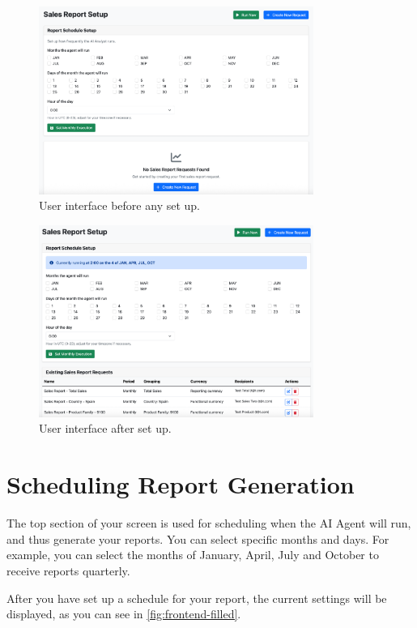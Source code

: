 \documentclass[a4paper]{report}
\begin{document}
\begin{figure}[H]
\centering
\includegraphics[width=0.8\textwidth]{images/frontend-empty.png}
\caption{User interface before any set up.}
\label{fig:frontend-empty}
\end{figure}

\begin{figure}[h]
\centering
\includegraphics[width=0.8\textwidth]{images/frontend-filled.png}
\caption{User interface after set up.}
\label{fig:frontend-filled}
\end{figure}

\section{Scheduling Report Generation}

The top section of your screen is used for scheduling when the AI Agent will run, and thus generate your reports. You can select specific months and days. For example, you can select the months of January, April, July and October to receive reports quarterly.

After you have set up a schedule for your report, the current settings will be displayed, as you can see in \autoref{fig:frontend-filled}.
\end{document}
